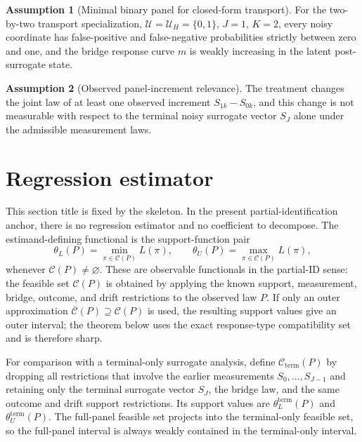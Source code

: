 \documentclass[11pt]{article}
\theoremstyle{definition}
\newtheorem{assumption}{Assumption}
\theoremstyle{plain}
\theoremstyle{remark}
\begin{document}
\begin{assumption}[Minimal binary panel for closed-form transport]\label{ass:minimal-binary}
For the two-by-two transport specialization, \(\mathcal U=\mathcal U_H=\{0,1\}\), \(J=1\), \(K=2\), every noisy coordinate has false-positive and false-negative probabilities strictly between zero and one, and the bridge response curve \(m\) is weakly increasing in the latent post-surrogate state.
\end{assumption}

\begin{assumption}[Observed panel-increment relevance]\label{ass:increment-relevance}
The treatment changes the joint law of at least one observed increment \(S_{1k}-S_{0k}\), and this change is not measurable with respect to the terminal noisy surrogate vector \(S_J\) alone under the admissible measurement laws.
\end{assumption}

\section{Regression estimator}
This section title is fixed by the skeleton.  In the present partial-identification anchor, there is no regression estimator and no coefficient to decompose.  The estimand-defining functional is the support-function pair
\[
  \theta_L(P)=
  \min_{\pi\in\mathcal C(P)} L(\pi),
  \qquad
  \theta_U(P)=
  \max_{\pi\in\mathcal C(P)} L(\pi),
\]
whenever \(\mathcal C(P)\ne\varnothing\).  These are observable functionals in the partial-ID sense: the feasible set \(\mathcal C(P)\) is obtained by applying the known support, measurement, bridge, outcome, and drift restrictions to the observed law \(P\).  If only an outer approximation \(\overline{\mathcal C}(P)\supseteq\mathcal C(P)\) is used, the resulting support values give an outer interval; the theorem below uses the exact response-type compatibility set and is therefore sharp.

For comparison with a terminal-only surrogate analysis, define \(\mathcal C_{\mathrm{term}}(P)\) by dropping all restrictions that involve the earlier measurements \(S_0,\ldots,S_{J-1}\) and retaining only the terminal surrogate vector \(S_J\), the bridge law, and the same outcome and drift support restrictions.  Its support values are \(\theta_L^{\mathrm{term}}(P)\) and \(\theta_U^{\mathrm{term}}(P)\).  The full-panel feasible set projects into the terminal-only feasible set, so the full-panel interval is always weakly contained in the terminal-only interval.
\end{document}

